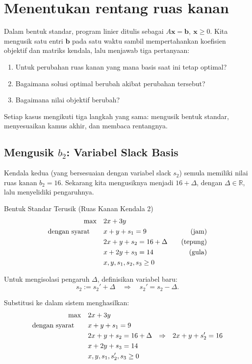 \section{Menentukan rentang ruas kanan}
\label{sec:sensitivity-rhs}

Dalam bentuk standar, program linier ditulis sebagai \( A\mathbf{x} = \mathbf{b}, \ \mathbf{x} \geq 0 \). Kita mengusik satu entri \( \mathbf{b} \) pada satu waktu sambil mempertahankan koefisien objektif dan matriks kendala, lalu menjawab tiga pertanyaan:
\begin{enumerate}
    \item Untuk perubahan ruas kanan yang mana basis saat ini tetap optimal?
    \item Bagaimana solusi optimal berubah akibat perubahan tersebut?
    \item Bagaimana nilai objektif berubah?
\end{enumerate}
Setiap kasus mengikuti tiga langkah yang sama: mengusik bentuk standar, menyesuaikan kamus akhir, dan membaca rentangnya.

\subsection{Mengusik \( b_2 \): Variabel Slack Basis}

Kendala kedua (yang bersesuaian dengan variabel slack \( s_2 \)) semula memiliki nilai ruas kanan \( b_2 = 16 \). Sekarang kita mengusiknya menjadi \( 16 + \Delta \), dengan \( \Delta \in \mathbb{R} \), lalu menyelidiki pengaruhnya.

\begin{sensdisplay}{Bentuk Standar Terusik (Ruas Kanan Kendala 2)}
\[
\begin{aligned}
\max \quad & 2x + 3y \\
\mbox{dengan syarat}\quad \quad
& x + y + s_1 = 9 \quad & \mbox{(jam)} \\
& 2x + y + s_2 = 16 + \Delta \quad & \mbox{(tepung)} \\
& x + 2y + s_3 = 14 \quad & \mbox{(gula)} \\
& x, y, s_1, s_2, s_3 \geq 0
\end{aligned}
\]

Untuk mengisolasi pengaruh \( \Delta \), definisikan variabel baru:
\[
s_2:= s_2' + \Delta \quad \Rightarrow \quad s_2' = s_2 - \Delta.
\]

Substitusi ke dalam sistem menghasilkan:
\[
\begin{aligned}
\max \quad & 2x + 3y \\
\mbox{dengan syarat}\quad \quad
& x + y + s_1 = 9 \\
& 2x + y + s_2= 16 + \Delta  & \Rightarrow &&  2x + y + s_2'= 16\\
& x + 2y + s_3 = 14 \\
& x, y, s_1, s_2', s_3 \geq 0
\end{aligned}
\]
\end{sensdisplay}

